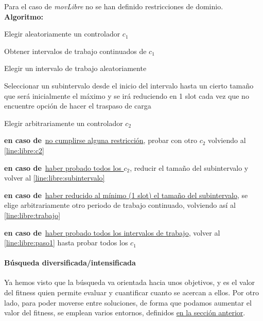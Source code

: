 Para el caso de \textit{movLibre} no se han definido restricciones de dominio.
\newpage
\textbf{Algoritmo:}
\SetAlgoNoLine
\LinesNumbered
\SetAlgoNoEnd
\DontPrintSemicolon
\begin{algorithm}[h]
	\label{algoritmo:movLibre}
	\SetAlgoNoEnd
	Elegir aleatoriamente un controlador $c_1$  \label{line:libre:paso1}\;
	\algovspace
	
	Obtener intervalos de trabajo continuados de $c_1$\;
	\algovspace
	
	Elegir un intervalo de trabajo aleatoriamente \label{line:libre:trabajo}\;
	\algovspace
	
	Seleccionar un subintervalo desde el inicio del intervalo hasta un cierto tamaño que será inicialmente el máximo y se irá reduciendo en 1 slot cada vez que no encuentre opción de hacer el traspaso de carga \label{line:libre:subintervalo}\;
	\algovspace
	
	Elegir arbitrariamente un controlador $c_2$ \label{line:libre:c2}\;
	\algovspace
	
	\algovspace
	
	\textbf{en caso de\,} \underline{no cumplirse alguna restricción}, probar con otro $c_2$ volviendo al \autoref{line:libre:c2}\;
	\algovspace
	
	\textbf{en caso de\,} \underline{haber probado todos los $c_2$}, reducir el tamaño del subintervalo y volver al \autoref{line:libre:subintervalo}\;
	\algovspace
	
	\textbf{en caso de\,} \underline{haber reducido al mínimo (1 slot) el tamaño del subintervalo}, se elige arbitrariamente otro periodo de trabajo continuado, volviendo así al \autoref{line:libre:trabajo}\;
	\algovspace
	
	\textbf{en caso de\,} \underline{haber probado todos los intervalos de trabajo}, volver al \autoref{line:libre:paso1} hasta probar todos los $c_1$\;
	\algovspace
\end{algorithm}


\paragraph{Búsqueda diversificada/intensificada} \label{capitulo:3:busqueda-divers-intens}
Ya hemos visto que la búsqueda va orientada hacia unos objetivos, y es el valor del fitness quien permite evaluar y cuantificar cuanto se acercan a ellos. Por otro lado, para poder moverse entre soluciones, de forma que podamos aumentar
el valor del fitness, se emplean varios entornos, definidos \hyperref[paragraph:entornos]{en la sección anterior}.


